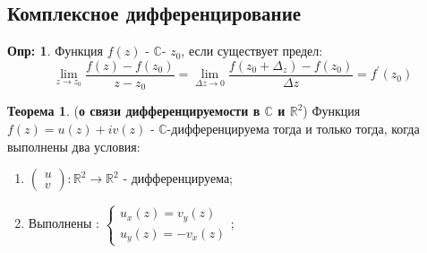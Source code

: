 \documentclass[12pt]{article}
\newcommand{\MR}{\mathbb{R}}
\newcommand{\MC}{\mathbb{C}}
\theoremstyle{definition}
\newtheorem{defn}{Опр:}
\newtheorem{theorem}{Теорема}
\begin{document}
\subsection*{Комплексное дифференцирование}
\begin{defn}
	Функция $f(z)$ - $\MC$- $z_0$, если существует предел:
	$$
		\lim\limits_{z \to z_0} \dfrac{f(z) - f(z_0)}{z - z_0} = \lim\limits_{\Delta z \to 0}\dfrac{f(z_0 + \Delta_z) - f(z_0)}{\Delta z} =f^\prime(z_0)
	$$
\end{defn}
\begin{theorem}(\textbf{о связи дифференцируемости в $\MC$ и $\MR^2$})
	Функция $f(z) = u(z) + iv(z)$ - $\MC$-дифференцируема тогда и только тогда, когда выполнены два условия:
	\begin{enumerate}[label={\arabic*)}]
		\item $\begin{pmatrix}
			u \\
			v
		\end{pmatrix} \colon \MR^2 \to \MR^2$ - дифференцируема;
		\item Выполнены : $\begin{cases}
			u_x(z) = v_y(z)\\
			u_y(z) = -v_x(z)
		\end{cases}$;
	\end{enumerate}
\end{theorem}
\end{document}
